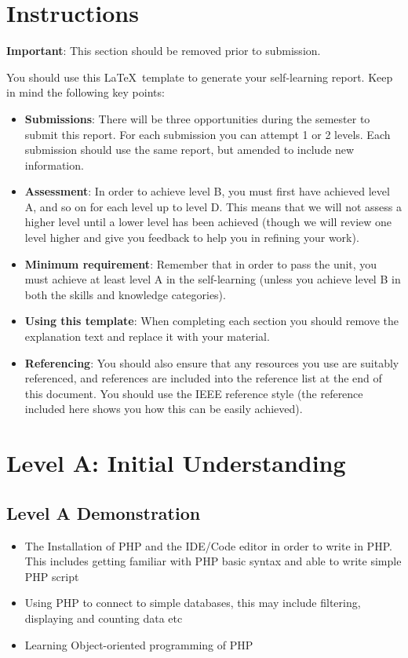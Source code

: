 \documentclass[a4paper, 11pt]{report}
\begin{document}
\newpage
\section*{Instructions}

\textbf{Important}: This section should be removed prior to submission.

You should use this \LaTeX\ template to generate your self-learning report. Keep in mind the following key points:
\begin{itemize}
	\item \textbf{Submissions}: There will be three opportunities during the semester to submit this report. For each submission you can attempt 1 or 2 levels. Each submission should use the same report, but amended to include new information.
	\item \textbf{Assessment}: In order to achieve level B, you must first have achieved level A, and so on for each level up to level D. This means that we will not assess a higher level until a lower level has been achieved (though we will review one level higher and give you feedback to help you in refining your work).
	\item \textbf{Minimum requirement}: Remember that in order to pass the unit, you must achieve at least level A in the self-learning (unless you achieve level B in both the skills and knowledge categories).
	\item \textbf{Using this template}: When completing each section you should remove the explanation text and replace it with your material.
	\item \textbf{Referencing}: You should also ensure that any resources you use are suitably referenced, and references are included into the reference list at the end of this document. You should use the IEEE reference style \cite{usyd2} (the reference included here shows you how this can be easily achieved).
\end{itemize}




\newpage
\section{Level A: Initial Understanding}
\vspace{5mm}
\subsection{Level A Demonstration}
\begin{itemize}
  \item The Installation of PHP and the IDE/Code editor in order to write in PHP. This includes getting familiar with PHP basic syntax and able to write simple PHP script
  \item Using PHP to connect to simple databases, this may include filtering, displaying and counting data etc
  \item Learning Object-oriented programming of PHP
\end{itemize}
\end{document}

